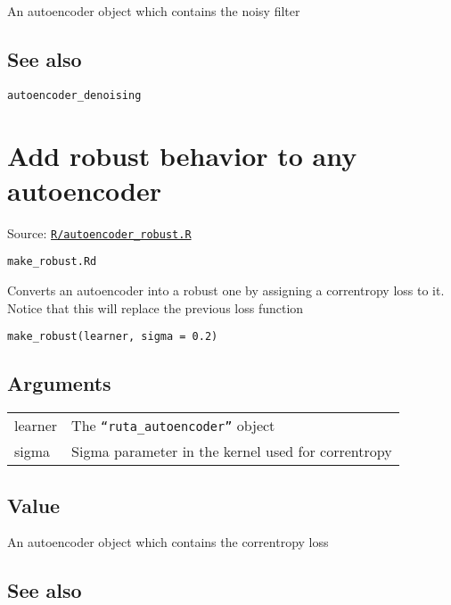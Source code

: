 An autoencoder object which contains the noisy filter

\hypertarget{see-also}{\subsection{\texorpdfstring{\protect\hyperlink{see-also}{}See
also}{See also}}\label{see-also}}

\texttt{autoencoder\_denoising}

\section{Add robust behavior to any
autoencoder}\label{add-robust-behavior-to-any-autoencoder}

Source:
\href{https://github.com/fdavidcl/ruta/blob/master/R/autoencoder_robust.R}{\texttt{R/autoencoder\_robust.R}}

\texttt{make\_robust.Rd}

Converts an autoencoder into a robust one by assigning a correntropy
loss to it. Notice that this will replace the previous loss function

\begin{verbatim}
make_robust(learner, sigma = 0.2)
\end{verbatim}

\hypertarget{arguments}{\subsection{\texorpdfstring{\protect\hyperlink{arguments}{}Arguments}{Arguments}}\label{arguments}}

\begin{longtable}[c]{@{}>{\small}p{3cm}>{\raggedright}p{12.5cm}@{}}
\toprule
learner & The \texttt{``ruta\_autoencoder''} object\tabularnewline
sigma & Sigma parameter in the kernel used for
correntropy\tabularnewline
\bottomrule
\end{longtable}

\hypertarget{value}{\subsection{\texorpdfstring{\protect\hyperlink{value}{}Value}{Value}}\label{value}}

An autoencoder object which contains the correntropy loss

\hypertarget{see-also}{\subsection{\texorpdfstring{\protect\hyperlink{see-also}{}See
also}{See also}}\label{see-also}}

